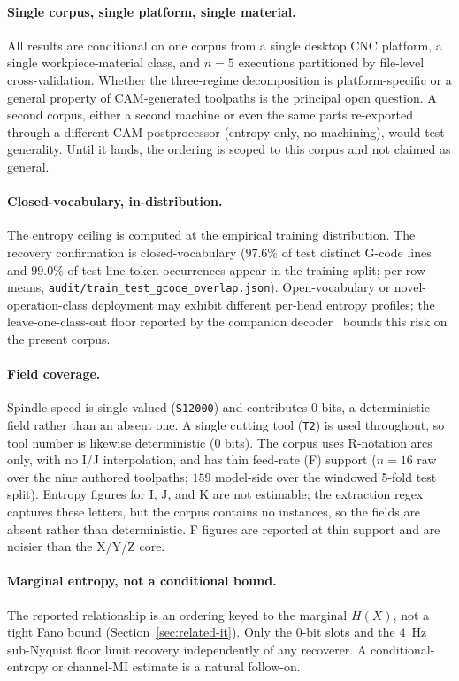 \documentclass[entropy,article,submit,moreauthors,pdftex]{Definitions/mdpi}
\begin{document}
\paragraph{Single corpus, single platform, single material.} All results are conditional on one corpus from a single desktop CNC platform, a single workpiece-material class, and $n=5$ executions partitioned by file-level cross-validation. Whether the three-regime decomposition is platform-specific or a general property of CAM-generated toolpaths is the principal open question. A second corpus, either a second machine or even the same parts re-exported through a different CAM postprocessor (entropy-only, no machining), would test generality. Until it lands, the ordering is scoped to this corpus and not claimed as general.

\paragraph{Closed-vocabulary, in-distribution.} The entropy ceiling is computed at the empirical training distribution. The recovery confirmation is closed-vocabulary ($97.6\%$ of test distinct G-code lines and $99.0\%$ of test line-token occurrences appear in the training split; per-row means, \texttt{audit/train\_test\_gcode\_overlap.json}). Open-vocabulary or novel-operation-class deployment may exhibit different per-head entropy profiles; the leave-one-class-out floor reported by the companion decoder~\cite{paperA_decoder} bounds this risk on the present corpus.

\paragraph{Field coverage.} Spindle speed is single-valued (\texttt{S12000}) and contributes $0$ bits, a deterministic field rather than an absent one. A single cutting tool (\texttt{T2}) is used throughout, so tool number is likewise deterministic ($0$ bits). The corpus uses R-notation arcs only, with no I/J interpolation, and has thin feed-rate (F) support ($n=16$ raw over the nine authored toolpaths; $159$ model-side over the windowed 5-fold test split). Entropy figures for I, J, and K are not estimable; the extraction regex captures these letters, but the corpus contains no instances, so the fields are absent rather than deterministic. F figures are reported at thin support and are noisier than the X/Y/Z core.

\paragraph{Marginal entropy, not a conditional bound.} The reported relationship is an ordering keyed to the marginal $H(X)$, not a tight Fano bound (Section~\ref{sec:related-it}). Only the $0$-bit slots and the 4~Hz sub-Nyquist floor limit recovery independently of any recoverer. A conditional-entropy or channel-MI estimate is a natural follow-on.
\end{document}
